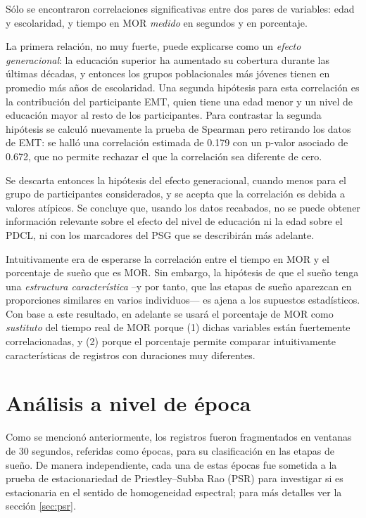 \documentclass[12pt,letterpaper]{book}
\begin{document}
Sólo se encontraron correlaciones significativas entre dos pares de variables: edad y escolaridad, y tiempo en MOR \textit{medido} en segundos y en porcentaje.

La primera relación, no muy fuerte, puede explicarse como un \textit{efecto generacional}: la educación superior ha aumentado su cobertura durante las últimas décadas, y entonces los grupos poblacionales más jóvenes tienen en promedio más años de escolaridad. 
%
Una segunda hipótesis para esta correlación es la contribución del participante EMT, quien tiene una edad menor y un nivel de educación mayor al resto de los participantes.
%
Para contrastar la segunda hipótesis se calculó nuevamente la prueba de Spearman pero retirando los datos de EMT: se halló una correlación estimada de 0.179 con un p-valor asociado de 0.672, que no permite rechazar el que la correlación sea diferente de cero.

Se descarta entonces la hipótesis del efecto generacional, cuando menos para el grupo de participantes considerados, y se acepta que la correlación es debida a valores atípicos. Se concluye que, usando los datos recabados, no se puede obtener información relevante sobre el efecto del nivel de educación ni la edad sobre el PDCL, ni con los marcadores del PSG que se describirán más adelante.

Intuitivamente era de esperarse la correlación entre el tiempo en MOR y el porcentaje de sueño que es MOR.
%
Sin embargo, la hipótesis de que el sueño tenga una \textit{estructura característica} --y por tanto, que las etapas de sueño aparezcan en proporciones similares en varios individuos--- es ajena a los supuestos estadísticos.
%
Con base a este resultado, en adelante se usará el porcentaje de MOR como \textit{sustituto} del tiempo real de MOR porque (1) dichas variables están fuertemente correlacionadas, y (2) porque el porcentaje permite comparar intuitivamente características de registros con duraciones muy diferentes.


\section{Análisis a nivel de época}
\label{sec:analisis_epoca}

Como se mencionó anteriormente, los registros fueron fragmentados en ventanas de 30 segundos, referidas como épocas, para su clasificación en las etapas de sueño.
%
De manera independiente, cada una de estas épocas fue sometida a la prueba de estacionariedad de Priestley--Subba Rao (PSR) para investigar si es estacionaria en el sentido de homogeneidad espectral; para más detalles ver la sección \ref{sec:psr}.
\end{document}
